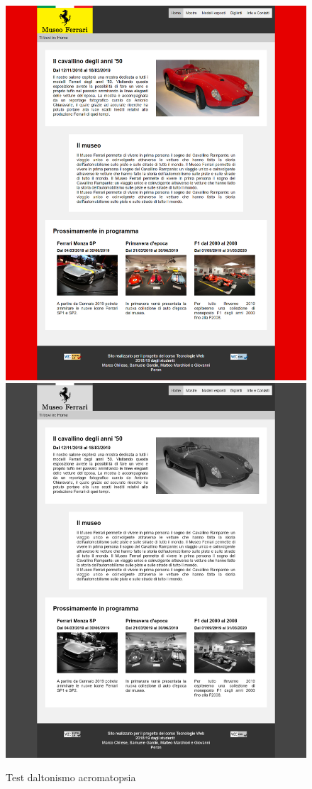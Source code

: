 \begin{figure}[!h]
	\begin{center}
		\includegraphics[scale=0.144]{Images/original.png}
		\includegraphics[scale=0.144]{Images/acromatopsia.png}
		\caption{Test daltonismo acromatopsia}
	\end{center}
\end{figure}
